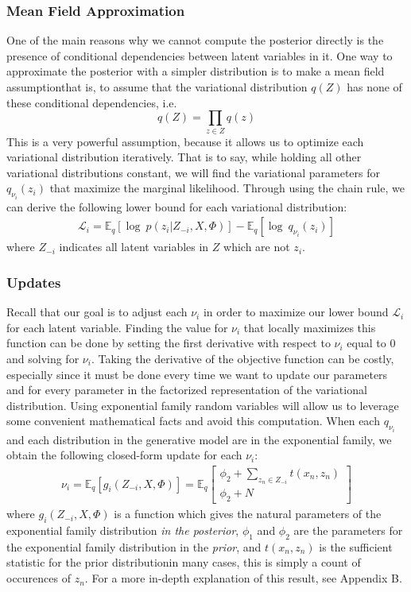 \documentclass[12pt,letterpaper]{article}
\begin{document}
\subsubsection{Mean Field Approximation} 
One of the main reasons why we cannot compute the posterior directly is the presence of conditional dependencies between latent variables in it. One way to approximate the posterior with a simpler distribution is to make a mean field assumption\textemdash that is, to assume that the variational distribution $q(Z)$ has none of these conditional dependencies, i.e. $$ q(Z) = \prod\limits_{z 
\in Z} q(z)$$ This is a very powerful assumption, because it allows us to optimize each variational distribution iteratively. That is to say, while holding all other variational distributions constant, we will find the variational parameters for $q_{\nu_i}(z_i)$ that maximize the marginal likelihood. Through using the chain rule, we can derive the following lower bound for each variational distribution:
\begin{align}
\mathcal{L}_i = \mathbb{E}_q[\log\ p(z_i| Z_{-i}, X, \Phi)] - \mathbb{E}_q[\log\ q_{\nu_i}(z_i)]
\end{align} 
where $Z_{-i}$ indicates all latent variables in $Z$ which are not $z_i$. 

\subsubsection{Updates}
Recall that our goal is to adjust each $\nu_i$ in order to maximize our lower bound $\mathcal{L}_i$ for each latent variable. Finding the value for $\nu_i$ that locally maximizes this function can be done by setting the first derivative with respect to $\nu_i$ equal to 0 and solving for $\nu_i$. Taking the derivative of the objective function can be costly, especially since it must be done every time we want to update our parameters and for every parameter in the factorized representation of the variational distribution. Using exponential family random variables will allow us to leverage some convenient mathematical facts and avoid this computation. When each $q_{\nu_i}$ and each distribution in the generative model are in the exponential family, we obtain the following closed-form update for each $\nu_i$: 
\begin{align}
\nu_i = \mathbb{E}_q[g_i(Z_{-i}, X, \Phi)] = \mathbb{E}_q \begin{bmatrix} \phi_2 + \sum\limits_{z_n \in Z_{-i}} t(x_n, z_n) \\ \phi_2 + N \end{bmatrix}
\end{align}
where $g_i(Z_{-i}, X, \Phi)$ is a function which gives the natural parameters of the exponential family distribution \textit{in the posterior}, $\phi_1$ and $\phi_2$ are the parameters for the exponential family distribution in the \textit{prior}, and $t(x_n, z_n)$ is the sufficient statistic for the prior distribution\textemdash in many cases, this is simply a count of occurences of $z_n$. For a more in-depth explanation of this result, see Appendix B. 
\end{document}
